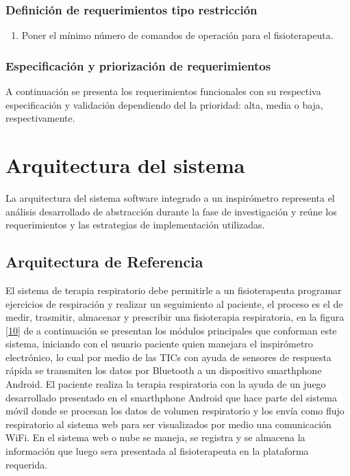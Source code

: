 \documentclass[12pt]{article}
\begin{document}
\subsubsection{Definición de requerimientos tipo restricción}

\begin{enumerate}[start=1,label={\bfseries RTR\arabic*.}]

\item Poner el mínimo número de comandos de operación para el fisioterapeuta.


\end{enumerate}


\subsubsection{Especificación y priorización de requerimientos}

A continuación se presenta los requerimientos funcionales con su respectiva especificación y validación dependiendo del la prioridad: alta, media o baja, respectivamente.




\newpage




\section{Arquitectura del sistema}

La arquitectura del sistema software integrado a un inspirómetro representa el análisis desarrollado de abstracción durante la fase de investigación y reúne los requerimientos y las estrategias de implementación utilizadas.



\subsection{Arquitectura de Referencia}


El sistema de terapia respiratorio debe permitirle a un fisioterapeuta programar ejercicios de respiración y realizar un seguimiento al paciente, el proceso es el de medir, trasmitir, almacenar y prescribir una fisioterapia respiratoria, en la figura \ref{10} de a continuación se presentan los módulos principales que conforman este sistema, iniciando con el usuario paciente quien manejara el inspirómetro electrónico, lo cual por medio de las TICs con ayuda de sensores de respuesta rápida se transmiten los datos por Bluetooth a un dispositivo smarthphone Android. El paciente realiza la terapia respiratoria con la ayuda de un juego desarrollado presentado en el smarthphone Android que hace parte del sistema móvil donde se procesan los datos de volumen respiratorio y los envía como flujo respiratorio al sistema web para ser visualizados por medio una comunicación WiFi. En el sistema web o nube se maneja, se registra y se almacena la información que luego sera presentada al fisioterapeuta en la plataforma requerida.
\end{document}
